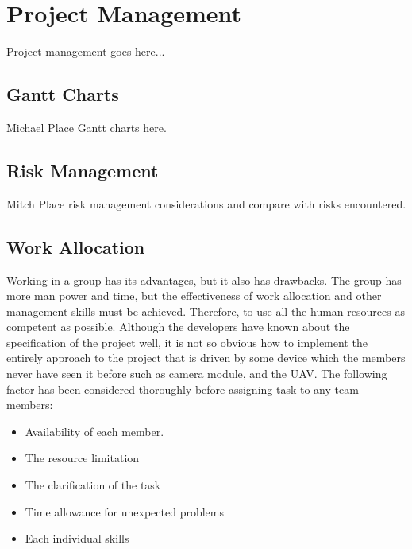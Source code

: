 \documentclass[oneside]{ecsgdp}         %
\begin{document}
\chapter{Project Management}
Project management goes here...

\section{Gantt Charts}
Michael
Place Gantt charts here.

\section{Risk Management}
Mitch
Place risk management considerations and compare with risks encountered.

\section{Work Allocation}

Working in a group has its advantages, but it also has drawbacks. The group has more man power and time, but the effectiveness of work allocation and other management skills must be achieved. Therefore, to use all the human resources as competent as possible. Although the developers have known about the specification of the project well, it is not so obvious how to implement the entirely approach to the project that is driven by some device which the members never have seen it before such as camera module, and the UAV. The following factor has been considered thoroughly before assigning task to any team members:

\begin{itemize}
\item	Availability of each member.

\item	The resource limitation
 
\item	The clarification of the task

\item   Time allowance for unexpected problems

\item	Each individual skills
\end{itemize}
\end{document}
